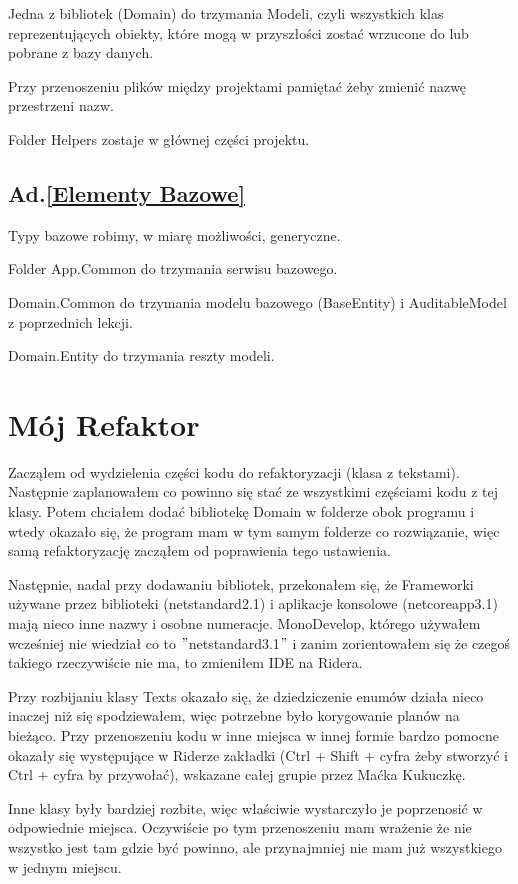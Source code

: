 \documentclass[10pt]{article}
\begin{document}
Jedna z bibliotek (Domain) do trzymania Modeli, czyli wszystkich klas reprezentujących obiekty, które mogą w przyszłości zostać wrzucone do lub pobrane z bazy danych.

Przy przenoszeniu plików między projektami pamiętać żeby zmienić nazwę przestrzeni nazw.

Folder Helpers zostaje w głównej części projektu.

\subsection{Ad.\ref{Elementy Bazowe}}
Typy bazowe robimy, w miarę możliwości, generyczne.

Folder App.Common do trzymania serwisu bazowego.

Domain.Common do trzymania modelu bazowego (BaseEntity) i AuditableModel z poprzednich lekcji.

Domain.Entity do trzymania reszty modeli.

\section{Mój Refaktor}
Zacząłem od wydzielenia części kodu do refaktoryzacji (klasa z tekstami). Następnie zaplanowałem co powinno się stać ze wszystkimi częściami kodu z tej klasy. Potem chciałem dodać bibliotekę Domain w folderze obok programu i wtedy okazało się, że program mam w tym samym folderze co rozwiązanie, więc samą refaktoryzację zacząłem od poprawienia tego ustawienia.

Następnie, nadal przy dodawaniu bibliotek, przekonałem się, że Frameworki używane przez biblioteki (netstandard2.1) i aplikacje konsolowe (netcoreapp3.1) mają nieco inne nazwy i osobne numeracje. MonoDevelop, którego używałem wcześniej nie wiedział co to $"$netstandard3.1$"$ i zanim zorientowałem się że czegoś takiego rzeczywiście nie ma, to zmieniłem IDE na Ridera.

Przy rozbijaniu klasy Texts okazało się, że dziedziczenie enumów działa nieco inaczej niż się spodziewałem, więc potrzebne było korygowanie planów na bieżąco. Przy przenoszeniu kodu w inne miejsca w innej formie bardzo pomocne okazały się występujące w Riderze zakładki (Ctrl + Shift + cyfra żeby stworzyć i Ctrl + cyfra by przywołać), wskazane całej grupie przez Maćka Kukuczkę.

Inne klasy były bardziej rozbite, więc właściwie wystarczyło je poprzenosić w odpowiednie miejsca. Oczywiście po tym przenoszeniu mam wrażenie że nie wszystko jest tam gdzie być powinno, ale przynajmniej nie mam już wszystkiego w jednym miejscu.
\end{document}

